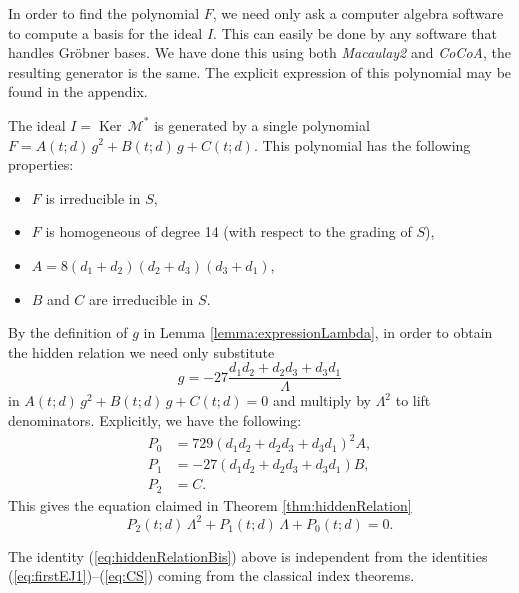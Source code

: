 \documentclass[phd,tocprelim]{cornell}
\begin{document}
In order to find the polynomial $F$, we need only ask a computer algebra software to compute a basis for the ideal $I$. This can easily be done by any software that handles Gr\"{o}bner bases. We have done this using both \textit{Macaulay2} and \textit{CoCoA}, the resulting generator is the same. The explicit expression of this polynomial may be found in the appendix.

\begin{proposition}\label{prop:descriptionF}
 The ideal $I=\operatorname{Ker}\,\mathcal{M}^*$ is generated by a single polynomial $F=A(t;d)\,g^2+B(t;d)\,g+C(t;d)$. This polynomial has the following properties:
 \begin{itemize}[topsep=-2pt,itemsep=-4pt]
  \item $F$ is irreducible in $S$,
  \item $F$ is homogeneous of degree 14 (with respect to the grading of $S$),
  \item $A=8(d_1+d_2)(d_2+d_3)(d_3+d_1)$,
  \item $B$ and $C$ are irreducible in $S$.
 \end{itemize}
\end{proposition}

By the definition of $g$ in Lemma \ref{lemma:expressionLambda}, in order to obtain the hidden relation we need only substitute
 \[ g=-27\frac{d_1d_2+d_2d_3+d_3d_1}{\Lambda} \]
in $A(t;d)\,g^2+B(t;d)\,g+C(t;d)=0$ and multiply by $\Lambda^2$ to lift denominators. Explicitly, we have the following:
\begin{align*} 
 P_0 &= 729(d_1d_2+d_2d_3+d_3d_1)^2A , \\
 P_1 &= -27(d_1d_2+d_2d_3+d_3d_1)B, \\
 P_2 &= C .
\end{align*}
This gives the equation claimed in Theorem \ref{thm:hiddenRelation}
 \begin{equation}\label{eq:hiddenRelationBis}
  P_2(t;d)\,\Lambda^2+P_1(t;d)\,\Lambda+P_0(t;d)=0.
 \end{equation}

\begin{proposition}\label{prop:independence}
 The identity (\ref{eq:hiddenRelationBis}) above is independent from the identities (\ref{eq:firstEJ1})--(\ref{eq:CS}) coming from the classical index theorems. 
\end{proposition}
\end{document}
